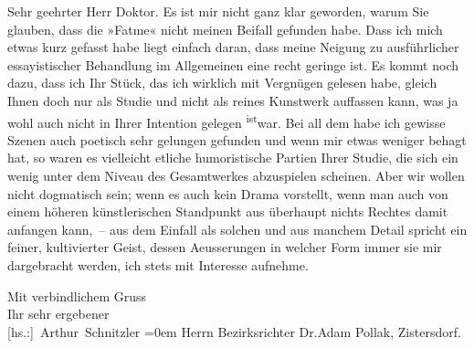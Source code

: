 \pstart\center{}Sehr geehrter Herr Doktor.\pend\vspace{0.5em}
\pstart
           Es ist mir nicht ganz klar geworden, warum Sie glauben, dass die »Fatme« nicht meinen Beifall gefunden habe. Dass ich mich etwas
               kurz gefasst habe liegt einfach daran, dass meine Neigung zu ausführlicher
               essayistischer Behandlung im Allgemeinen eine recht geringe ist. Es kommt noch dazu,
               dass ich Ihr Stück, das ich
               wirklich mit Vergnügen gelesen habe, gleich Ihnen doch nur als Studie und nicht als
               reines Kunstwerk auffassen kann, was ja wohl auch nicht in Ihrer Intention gelegen \substVorne{}\textsuperscript{ist}\substDazwischen{}war\substHinten{}. Bei all dem habe ich gewisse Szenen auch poetisch sehr gelungen gefunden
               und wenn mir etwas weniger behagt hat, so waren es vielleicht etliche humoristische
               Partien Ihrer Studie, die sich ein wenig unter dem Niveau des Gesamtwerkes abzuspielen scheinen. Aber wir
               wollen nicht dogmatisch sein; wenn {\pb}es auch kein Drama  vorstellt, wenn man auch von einem höheren
               künstlerischen Standpunkt aus überhaupt nichts Rechtes damit anfangen kann, – aus dem
               Einfall als solchen und aus manchem Detail spricht ein feiner, kultivierter Geist,
               dessen Aeusserungen in welcher Form immer sie mir dargebracht werden, ich \introOben{}stets\introOben{} mit Interesse aufnehme.\pend
           
\pstart
           Mit verbindlichem Gruss{\\[\baselineskip]}Ihr sehr ergebener{\\[\baselineskip]}\spacefill\mbox{{[}hs.:{]} Arthur Schnitzler}\pend
           \leftskip=0em{}
\pstart
           \noindent{}Herrn Bezirksrichter Dr.Adam Pollak, Zistersdorf.\pend
           \endnumbering{}  
      